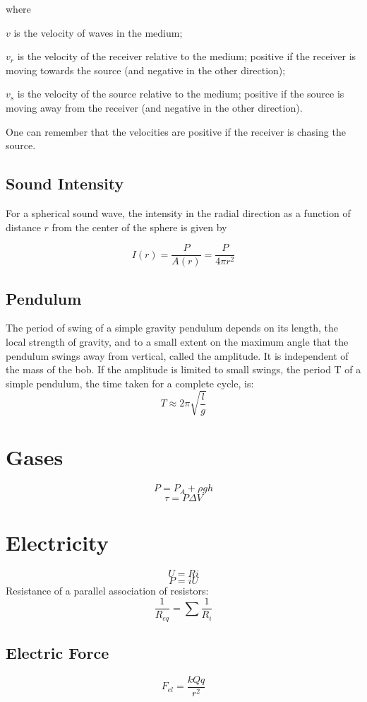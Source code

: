 \documentclass[oneside]{book} %
\theoremstyle{plain}
\newcommand*\reciprocal[1]{\frac{1}{#1}}
\begin{document}
where

\(v\) is the velocity of waves in the medium;

\(v_r\) is the velocity of the receiver relative to the medium; positive if the
receiver is moving towards the source (and negative in the other direction);

\(v_s\) is the velocity of the source relative to the medium; positive if the
source is moving away from the receiver (and negative in the other direction).

One can remember that the velocities are positive if the receiver is chasing
the source.

\section{Sound Intensity}
For a spherical sound wave, the intensity in the radial direction as a function
of distance \(r\) from the center of the sphere is given by

\[I(r) = \frac{P}{A(r)} = \frac{P}{4 \pi r^2}\]

\section{Pendulum}
The period of swing of a simple gravity pendulum depends on its length, the
local strength of gravity, and to a small extent on the maximum angle that the
pendulum swings away from vertical, called the amplitude. It is independent of
the mass of the bob. If the amplitude is limited to small swings, the period T
of a simple pendulum, the time taken for a complete cycle, is:
\[T \approx 2 \pi \sqrt{\frac{l}{g}}\]


\chapter{Gases}
\[P = P_A + \rho g h\]
\[\tau = P \Delta V\]


\chapter{Electricity}
\[U = R i\]
\[P = i U\]
Resistance of a parallel association of resistors:
\[\reciprocal{R_{eq}} = \sum{\reciprocal{R_i}}\]

\section{Electric Force}
\[F_{el} = \frac{k Q q}{r^2}\]
\end{document}
